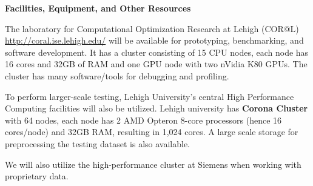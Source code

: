\documentclass[12pt]{article}
\begin{document}
 \begin{center}
 \bf
  Facilities, Equipment, and Other Resources
 \end{center}
  
 
 
The laboratory for Computational Optimization Research at Lehigh (COR@L)
\url{http://coral.ise.lehigh.edu/}
will be available for prototyping, benchmarking, and software development.
It has a cluster consisting of 15 CPU nodes, each node has 16 cores and  32GB of RAM
and one GPU node with two nVidia K80 GPUs.
The cluster has many software/tools for debugging and profiling.

 


To perform larger-scale 
testing, Lehigh University's central High Performance Computing facilities will also be utilized.
Lehigh university has  
{\bf Corona Cluster}
with 
64 nodes,
each node has 2 AMD Opteron 8-core processors (hence 16 cores/node) and 32GB RAM, resulting in
1,024 cores. A large scale storage for preprocessing the testing dataset is also available.

We will also utilize the high-performance cluster at Siemens when working with proprietary data.


\end{document}
